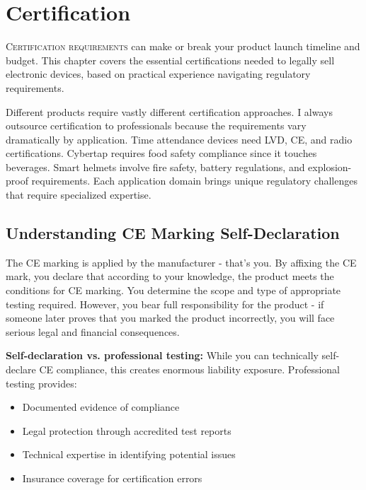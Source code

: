 \chapter{Certification}

\lettrine{C}{ertification requirements} can make or break your product launch timeline and budget. This chapter covers the essential certifications needed to legally sell electronic devices, based on practical experience navigating regulatory requirements.

Different products require vastly different certification approaches. I always outsource certification to professionals because the requirements vary dramatically by application. Time attendance devices need LVD, CE, and radio certifications. Cybertap requires food safety compliance since it touches beverages. Smart helmets involve fire safety, battery regulations, and explosion-proof requirements. Each application domain brings unique regulatory challenges that require specialized expertise.

\section{Understanding CE Marking Self-Declaration}

\begin{tcolorbox}[colback=yellow!10,colframe=orange!75!black,title=CE Marking Reality]
The CE marking is applied by the manufacturer - that's you. By affixing the CE mark, you declare that according to your knowledge, the product meets the conditions for CE marking. You determine the scope and type of appropriate testing required. However, you bear full responsibility for the product - if someone later proves that you marked the product incorrectly, you will face serious legal and financial consequences.
\end{tcolorbox}

\textbf{Self-declaration vs. professional testing:}
While you can technically self-declare CE compliance, this creates enormous liability exposure. Professional testing provides:
\begin{itemize}
\item Documented evidence of compliance
\item Legal protection through accredited test reports
\item Technical expertise in identifying potential issues
\item Insurance coverage for certification errors
\end{itemize}

